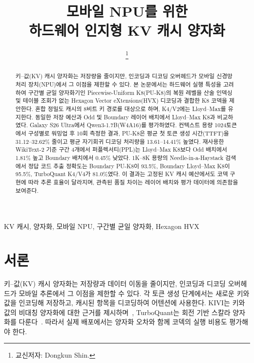 \documentclass[conference,a4paper,10pt]{IEEEtran}
\begin{document}
\title{모바일 NPU를 위한\\하드웨어 인지형 KV 캐시 양자화}
\author{
\and
{}
\thanks{교신저자: Dongkun Shin.}}
\maketitle

\begin{abstract}
키--값(KV) 캐시 양자화는 저장량을 줄이지만, 인코딩과 디코딩 오버헤드가 모바일 신경망 처리 장치(NPU)에서 그 이점을 제한할 수 있다. 본 논문에서는 하드웨어 실행 특성을 고려하여 구간별 균일 양자화기인 Piecewise-Uniform K8(PU-K8)의 복원 레벨을 산술 인덱싱 및 테이블 조회가 없는 Hexagon Vector eXtensions(HVX) 디코딩과 결합한 K8 코덱을 제안한다. 혼합 정밀도 캐시의 8비트 키 경로를 대상으로 하며, K4/V2에는 Lloyd--Max를 유지한다. 동일한 저장 예산과 Odd 및 Boundary 레이어 배치에서 Lloyd--Max K8과 비교하였다. Galaxy S26 Ultra에서 Qwen3-1.7B(W4A16)를 평가하였다. 컨텍스트 용량 1024토큰에서 구성별로 워밍업 후 10회 측정한 결과, PU-K8은 평균 첫 토큰 생성 시간(TTFT)을 31.12--32.62\% 줄이고 평균 자기회귀 디코딩 처리량을 13.61--14.41\% 높였다. 재사용한 WikiText-2 기준 구간 4개에서 퍼플렉서티(PPL)는 Lloyd--Max K8보다 Odd 배치에서 1.81\% 높고 Boundary 배치에서 0.45\% 낮았다. 1K--8K 용량의 Needle-in-a-Haystack 검색에서 정답 코드 추출 정확도는 Boundary PU-K8이 93.5\%, Boundary Lloyd--Max K8이 95.5\%, TurboQuant K4/V4가 81.0\%였다. 이 결과는 고정된 KV 캐시 예산에서도 코덱 구현에 따라 추론 효율이 달라지며, 관측된 품질 차이는 레이어 배치와 평가 데이터에 의존함을 보여준다.
\end{abstract}

\begin{IEEEkeywords}
KV 캐시, 양자화, 모바일 NPU, 구간별 균일 양자화, Hexagon HVX
\end{IEEEkeywords}

\section{서론}
키--값(KV) 캐시 양자화는 저장량과 데이터 이동을 줄이지만, 인코딩과 디코딩 오버헤드가 모바일 추론에서 그 이점을 제한할 수 있다. 각 토큰 생성 단계에서는 새로운 키와 값을 인코딩해 저장하고, 캐시된 항목을 디코딩하여 어텐션에 사용한다. KIVI는 키와 값의 비대칭 양자화에 대한 근거를 제시하며~\cite{kivi}, TurboQuant는 회전 기반 스칼라 양자화를 다룬다~\cite{turboquant}. 따라서 실제 배포에서는 양자화 오차와 함께 코덱의 실행 비용도 평가해야 한다.
\end{document}
